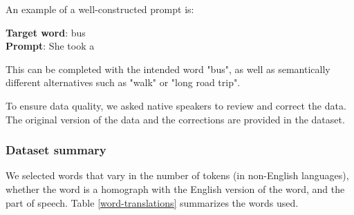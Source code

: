 An example of a well-constructed prompt is:
\begin{displayquote}
\textbf{Target word}: bus \\
\textbf{Prompt}: She took a 
\end{displayquote}
This can be completed with the intended word "bus", as well as semantically different alternatives such as "walk" or "long road trip".

To ensure data quality, we asked native speakers to review and correct the data. The original version of the data and the corrections are provided in the dataset. 

\FloatBarrier

\subsubsection{Dataset summary}

We selected words that vary in the number of tokens (in non-English languages), whether the word is a homograph with the English version of the word, and the part of speech. Table \ref{word-translations} summarizes the words used. 


